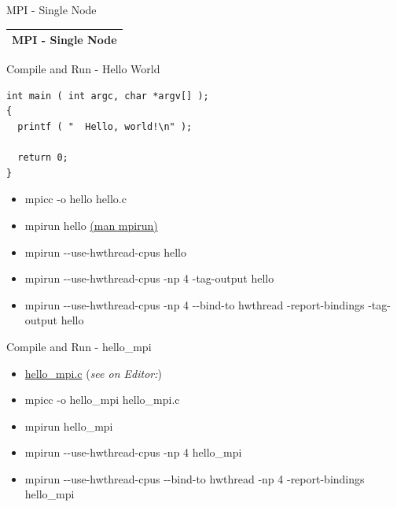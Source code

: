 \documentclass[ignorenonframetext,]{beamer}
\providecommand{\tightlist}{%
  \setlength{\itemsep}{0pt}\setlength{\parskip}{0pt}}
\begin{document}
\begin{frame}{MPI - Single Node}

\begin{longtable}[]{@{}l@{}}
\toprule
\endhead
MPI - Single Node\tabularnewline
\bottomrule
\end{longtable}

\end{frame}

\begin{frame}[fragile]{Compile and Run - Hello World}

\begin{verbatim}
int main ( int argc, char *argv[] );
{
  printf ( "  Hello, world!\n" );

  return 0;
}

\end{verbatim}

\begin{itemize}
\tightlist
\item
  mpicc -o hello hello.c
\item
  mpirun hello \href{https://linux.die.net/man/1/mpirun}{(man mpirun)}
\item
  mpirun -\/-use-hwthread-cpus hello
\item
  mpirun -\/-use-hwthread-cpus -np 4 -tag-output hello
\item
  mpirun -\/-use-hwthread-cpus -np 4 -\/-bind-to hwthread
  -report-bindings -tag-output hello
\end{itemize}


\end{frame}

\begin{frame}{Compile and Run - hello\_mpi}

\begin{itemize}
\item
  \url{hello_mpi.c} (\emph{see on Editor:})
\item
  mpicc -o hello\_mpi hello\_mpi.c
\item
  mpirun hello\_mpi
\item
  mpirun -\/-use-hwthread-cpus -np 4 hello\_mpi
\item
  mpirun -\/-use-hwthread-cpus -\/-bind-to hwthread -np 4
  -report-bindings hello\_mpi
\end{itemize}


\end{frame}
\end{document}
